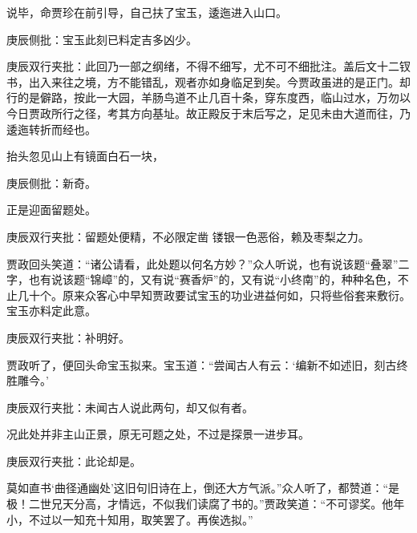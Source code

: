 \begin{parag}
    说毕，命贾珍在前引导，自己扶了宝玉，逶迤进入山口。\begin{note}庚辰侧批：宝玉此刻已料定吉多凶少。\end{note}\begin{note}庚辰双行夹批：此回乃一部之纲绪，不得不细写，尤不可不细批注。盖后文十二钗书，出入来往之境，方不能错乱，观者亦如身临足到矣。今贾政虽进的是正门。却行的是僻路，按此一大园，羊肠鸟道不止几百十条，穿东度西，临山过水，万勿以今日贾政所行之径，考其方向基址。故正殿反于末后写之，足见未由大道而往，乃逶迤转折而经也。\end{note}抬头忽见山上有镜面白石一块，\begin{note}庚辰侧批：新奇。\end{note}正是迎面留题处。\begin{note}庚辰双行夹批：留题处便精，不必限定凿 镂银一色恶俗，赖及枣梨之力。\end{note}贾政回头笑道：“诸公请看，此处题以何名方妙？”众人听说，也有说该题“叠翠”二字，也有说该题“锦嶂”的，又有说“赛香炉”的，又有说“小终南”的，种种名色，不止几十个。原来众客心中早知贾政要试宝玉的功业进益何如，只将些俗套来敷衍。宝玉亦料定此意。\begin{note}庚辰双行夹批：补明好。\end{note}贾政听了，便回头命宝玉拟来。宝玉道：“尝闻古人有云：‘编新不如述旧，刻古终胜雕今。’\begin{note}庚辰双行夹批：未闻古人说此两句，却又似有者。\end{note}况此处并非主山正景，原无可题之处，不过是探景一进步耳。\begin{note}庚辰双行夹批：此论却是。\end{note}莫如直书‘曲径通幽处’这旧句旧诗在上，倒还大方气派。”众人听了，都赞道：“是极！二世兄天分高，才情远，不似我们读腐了书的。”贾政笑道：“不可谬奖。他年小，不过以一知充十知用，取笑罢了。再俟选拟。”
\end{parag}


